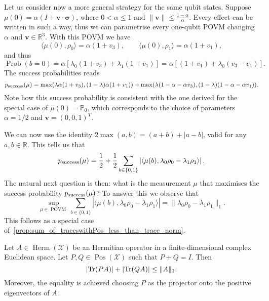 \documentclass[a4paper]{report}
\newcommand{\PP}{\mathbb{P}}
\newcommand{\RR}{\mathbb{R}}
\newcommand{\on}[1]{\operatorname{#1}}
\newcommand{\bs}[1]{\boldsymbol{#1}}
\newcommand{\calX}{{\mathcal{X}}}
\DeclareMathOperator{\Pos}{Pos}
\DeclareMathOperator{\Herm}{Herm}
\DeclareMathOperator{\Prob}{Prob}
\begin{document}
\begin{example}
	Let us consider now a more general strategy for the same qubit states.
	Suppose $\mu(0)= \alpha(I+\bs v\cdot\bs\sigma)$, where $0<\alpha\le1$ and $\|\bs v\|\le \frac{1-\alpha}{\alpha}$. Every effect can be written in such a way, thus we can parametrise every one-qubit POVM changing $\alpha$ and $\bs v\in\RR^3$. With this POVM we have
	\begin{equation}
		\langle\mu(0),\rho_0\rangle = \alpha(1+v_3),
		\qquad
		\langle\mu(0),\rho_1\rangle = \alpha(1+v_1),
	\end{equation}
	and thus
	\begin{equation}
		\Prob(b=0) = \alpha[\lambda_0(1+v_3) + \lambda_1(1+v_1)]
		= \alpha[(1+v_1) + \lambda_0 (v_3-v_1)].
	\end{equation}
	The success probabilities reads
	\begin{equation}
		p_{\rm success}(\mu)
		= \max(
		\lambda\alpha(1+v_3),
		(1-\lambda)\alpha(1+v_1)
		) +
		\max(
		\lambda(1-\alpha-\alpha v_3),
		(1-\lambda)(1-\alpha-\alpha v_1)
		).
		\label{eq:QST:success_prob_in_example_general_POVM}
	\end{equation}
	Note how this success probability is consistent with the one derived for the special case of $\mu(0)=\PP_0$, which corresponds to the choice of parameters $\alpha=1/2$ and $\bs v=(0,0,1)^T$.
\end{example}


We can now use the identity $2\max(a,b)=(a+b)+|a-b|$, valid for any $a,b\in\RR$. This tells us that
\begin{equation}
	p_{\rm success}(\mu)
	= \frac12 + \frac12
	\sum_{b\in\{0,1\}} \left\lvert
	\langle\mu(b), \lambda_0 \rho_0 - \lambda_1\rho_1\rangle
	\right\rvert.
\end{equation}
The natural next question is then: what is the measurement $\mu$ that maximises the success probability $p_{\rm success}(\mu)$?
To answer this we observe that
\begin{equation}
	\sup_{\mu\in\on{POVM}}
	\sum_{b\in\{0,1\}} \left\lvert
	\langle\mu(b), \lambda_0 \rho_0 - \lambda_1\rho_1\rangle
	\right\rvert
	= \|\lambda_0 \rho_0 - \lambda_1\rho_1\|_1.
\end{equation}
This follows as a special case of~\cref{prop:sum_of_traceswithPos_less_than_trace_norm}.

\begin{prop}
	Let $A\in\Herm(\calX)$ be an Hermitian operator in a finite-dimensional complex Euclidean space.
	Let $P,Q\in\Pos(\calX)$ such that $P+Q=I$. Then
	\begin{equation}
		\lvert \Tr(PA)\rvert
		+ \lvert \Tr(QA)\rvert \le \|A\|_1.
	\end{equation}
	Moreover, the equality is achieved choosing $P$ as the projector onto the positive eigenvectors of $A$.
	\label{prop:sum_of_traceswithPos_less_than_trace_norm}
\end{prop}
\end{document}
